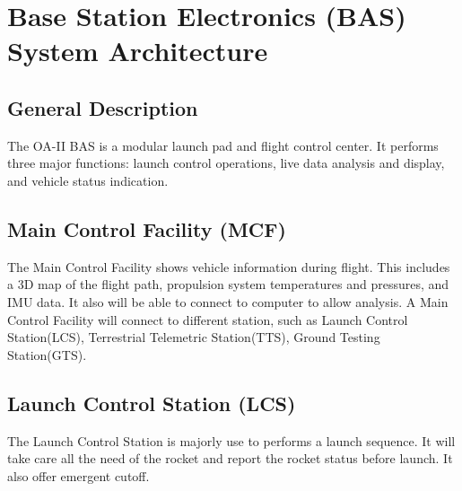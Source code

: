\documentclass[12pt,article]{memoir}
\begin{document}

\newpage

\chapter{Base Station Electronics (BAS) System Architecture}
\section{General Description}
The OA-II BAS is a modular launch pad and flight control center. It performs three major functions: launch control operations, live data analysis and display, and vehicle status indication.
\section{Main Control Facility (MCF)}
The Main Control Facility shows vehicle information during flight. This includes a 3D map of the flight path, propulsion system temperatures and pressures, and IMU data. It also will be able to connect to computer to allow analysis. A Main Control Facility will connect to different station, such as  Launch Control Station(LCS), Terrestrial Telemetric Station(TTS), Ground Testing Station(GTS).
\section{Launch Control Station (LCS)}
The Launch Control Station is majorly use to performs a launch sequence. It will take care all the need of the rocket and report the rocket status before launch. It also offer emergent cutoff. 
\end{document}
